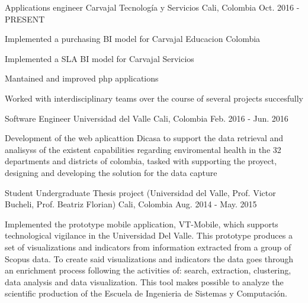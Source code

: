 

\begin{cventries}

  \cventry
    {Applications engineer} %
    {Carvajal Tecnología y Servicios} %
    {Cali, Colombia} %
    {Oct. 2016 - PRESENT} %
    {
      \begin{cvitems} %
        \item {Implemented a purchasing BI model for Carvajal Educacion Colombia}
        \item {Implemented a SLA BI model for Carvajal Servicios}
        \item {Mantained and improved php applications}
        \item {Worked with interdisciplinary teams over the course of several projects succesfully}
      \end{cvitems}
    }

  \cventry
    {Software Engineer} %
    {Universidad del Valle} %
    {Cali, Colombia} %
    {Feb. 2016 -  Jun. 2016} %
    {
      \begin{cvitems} %
        \item {Development of the web aplicattion Dicasa to support the data retrieval and analisyss of the existent capabilities regarding enviromental health in the 32 departments and districts of colombia, tasked with supporting the proyect, designing and developing the solution for the data capture}
      \end{cvitems}
    }

  \cventry
    {Student} %
    {Undergraduate Thesis project (Universidad del Valle, Prof. Victor Bucheli, Prof. Beatriz Florian) } %
    {Cali, Colombia} %
    {Aug. 2014 -  May. 2015} %
    {
      \begin{cvitems} %
        \item {Implemented the prototype mobile application, VT-Mobile, which supports technological vigilance in the Universidad Del Valle. This prototype produces a set of visualizations and indicators from information extracted from a group of Scopus data. To create said visualizations and indicators the data goes through an enrichment process following the activities of: search, extraction, clustering, data analysis and data visualization. This tool makes possible to analyze the scientific production of the Escuela de Ingenieria de Sistemas y Computación.}
      \end{cvitems}
    }


\end{cventries}
